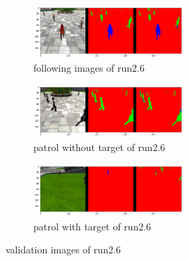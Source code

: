 \documentclass[paper=a4, fontsize=11pt]{scrartcl} %
\numberwithin{equation}{section} %
\numberwithin{figure}{section} %
\numberwithin{table}{section} %
\begin{document}
\begin{figure}[ht]
	\begin{subfigure}{0.33\textwidth}
	\includegraphics[width=0.9\linewidth, height=2cm]{./imgs/following_images26.png} 
	\caption{following images of run2.6}
	\label{fig:subfollowing_images26}
	\end{subfigure}
	\begin{subfigure}{0.33\textwidth}
	\includegraphics[width=0.9\linewidth, height=2cm]{./imgs/patrol_non_targ26.png}
	\caption{patrol without target of run2.6}
	\label{fig:subpatrol_non_targ26}
	\end{subfigure}
	\begin{subfigure}{0.33\textwidth}
	\includegraphics[width=0.9\linewidth, height=2cm]{./imgs/patrol_with_targ26.png}
	\caption{patrol with target of run2.6}
	\label{fig:subpatrol_with_targ26}
	\end{subfigure}

	\caption{validation images of run2.6}
	\label{fig:outputimages26}
\end{figure}
\end{document}
